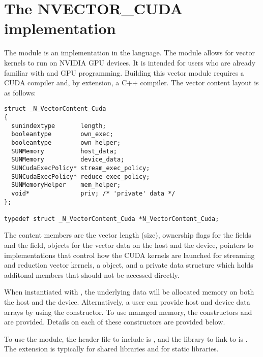 %
\section{The NVECTOR\_CUDA implementation}\label{ss:nvec_cuda}

The {\nveccuda} module is an {\nvector} implementation in the {\cuda} language.
The module allows for {\sundials} vector kernels to run on NVIDIA GPU devices. It is intended
for users who are already familiar with {\cuda} and GPU programming. Building this vector
module requires a CUDA compiler and, by extension, a C++ compiler. The vector content layout
is as follows:

\begin{verbatim}
struct _N_VectorContent_Cuda
{
  sunindextype       length;
  booleantype        own_exec;
  booleantype        own_helper;
  SUNMemory          host_data;
  SUNMemory          device_data;
  SUNCudaExecPolicy* stream_exec_policy;
  SUNCudaExecPolicy* reduce_exec_policy;
  SUNMemoryHelper    mem_helper;
  void*              priv; /* 'private' data */
};

typedef struct _N_VectorContent_Cuda *N_VectorContent_Cuda;
\end{verbatim}

The content members are the vector length (size), ownership flags for the
 fields and the  field, 
objects for the vector data on the host and the device, pointers to
 implementations that control how the CUDA kernels are
launched for streaming and reduction vector kernels, a 
object, and a private data structure which holds additonal members that should
not be accessed directly.

When instantiated with , the underlying data will be allocated
memory on both the host and the device. Alternatively, a user can provide host
and device data arrays by using the  constructor. To use {\cuda}
managed memory, the constructors  and \newline
{} are provided. Details on each of these constructors
are provided below.

To use the {\nveccuda} module, the header file to include is ,
and the library to link to is . The
extension  is typically  for shared libraries and 
for static libraries.

